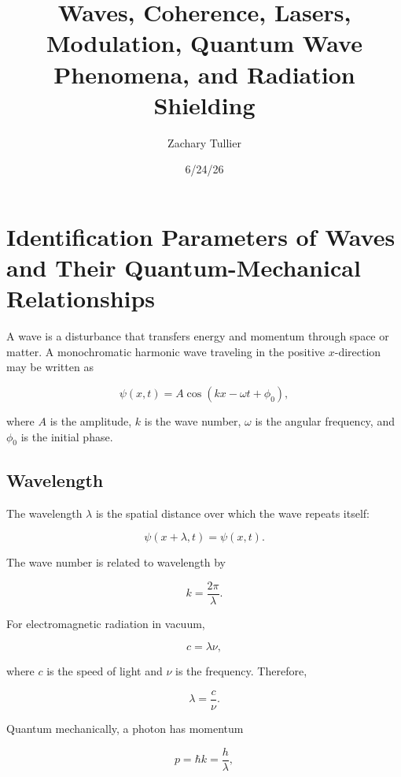 \documentclass[12pt]{article}
\title{Waves, Coherence, Lasers, Modulation, Quantum Wave Phenomena, and Radiation Shielding}
\author{Zachary Tullier}
\date{6/24/26}
\begin{document}
\maketitle
\tableofcontents
\newpage

\section{Identification Parameters of Waves and Their Quantum-Mechanical Relationships}

A wave is a disturbance that transfers energy and momentum through space or matter. A monochromatic harmonic wave traveling in the positive $x$-direction may be written as

\begin{equation}
\psi(x,t)=A\cos(kx-\omega t+\phi_0),
\end{equation}

where $A$ is the amplitude, $k$ is the wave number, $\omega$ is the angular frequency, and $\phi_0$ is the initial phase.

\subsection{Wavelength}

The wavelength $\lambda$ is the spatial distance over which the wave repeats itself:

\begin{equation}
\psi(x+\lambda,t)=\psi(x,t).
\end{equation}

The wave number is related to wavelength by

\begin{equation}
k=\frac{2\pi}{\lambda}.
\end{equation}

For electromagnetic radiation in vacuum,

\begin{equation}
c=\lambda \nu,
\end{equation}

where $c$ is the speed of light and $\nu$ is the frequency. Therefore,

\begin{equation}
\lambda=\frac{c}{\nu}.
\end{equation}

Quantum mechanically, a photon has momentum

\begin{equation}
p=\hbar k=\frac{h}{\lambda},
\end{equation}
\end{document}
